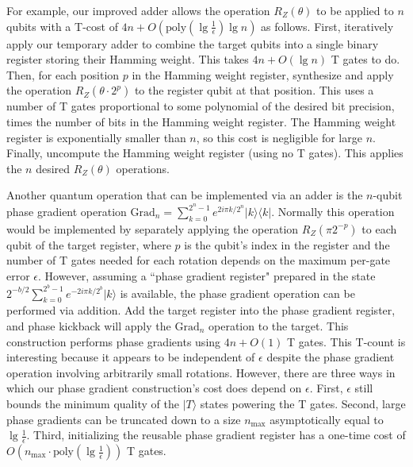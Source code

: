 \documentclass[twocolumn]{quantumarticle-customized}
\begin{document}
For example, our improved adder allows the operation $R_Z(\theta)$ to be applied to $n$ qubits with a T-cost of $4n + O(\text{poly}(\lg \frac{1}{\epsilon}) \lg n)$ as follows.
First, iteratively apply our temporary adder to combine the target qubits into a single binary register storing their Hamming weight.
This takes $4n + O(\lg n)$ T gates to do.
Then, for each position $p$ in the Hamming weight register, synthesize and apply the operation $R_Z(\theta \cdot 2^p)$ to the register qubit at that position.
This uses a number of T gates proportional to some polynomial of the desired bit precision, times the number of bits in the Hamming weight register.
The Hamming weight register is exponentially smaller than $n$, so this cost is negligible for large $n$.
Finally, uncompute the Hamming weight register (using no T gates).
This applies the $n$ desired $R_Z(\theta)$ operations.

Another quantum operation that can be implemented via an adder is the $n$-qubit phase gradient operation $\text{Grad}_n = \sum_{k=0}^{2^n-1} e^{2 i \pi k / 2^n} |k\rangle \langle k|$.
Normally this operation would be implemented by separately applying the operation $R_Z(\pi 2^{-p})$ to each qubit of the target register, where $p$ is the qubit's index in the register and the number of T gates needed for each rotation depends on the maximum per-gate error $\epsilon$.
However, assuming a ``phase gradient register" prepared in the state $2^{-b/2} \sum_{k=0}^{2^b-1} e^{-2 i \pi k / 2^b} |k\rangle$ is available, the phase gradient operation can be performed via addition.
Add the target register into the phase gradient register, and phase kickback will apply the $\text{Grad}_n$ operation to the target.
This construction performs phase gradients using $4n + O(1)$ T gates.
This T-count is interesting because it appears to be independent of $\epsilon$ despite the phase gradient operation involving arbitrarily small rotations.
However, there are three ways in which our phase gradient construction's cost does depend on $\epsilon$.
First, $\epsilon$ still bounds the minimum quality of the $|T\rangle$ states powering the T gates.
Second, large phase gradients can be truncated down to a size $n_{\text{max}}$ asymptotically equal to $\lg \frac{1}{\epsilon}$.
Third, initializing the reusable phase gradient register has a one-time cost of $O(n_{\text{max}} \cdot \text{poly}(\lg \frac{1}{\epsilon}))$ T gates.
\end{document}
